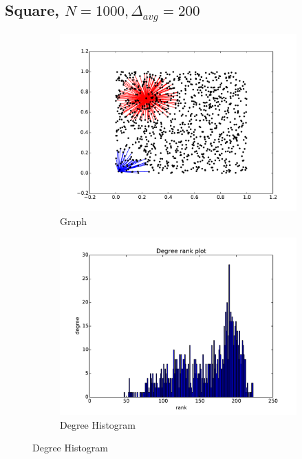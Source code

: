 \documentclass[oneside, titlepage]{scrartcl}
\begin{document}
\subsection{Square, $N=1000, \Delta_{avg}=200$}

\begin{figure}[!h]
\centering
\begin{subfigure}{0.5\textwidth}
	\centering
	\includegraphics[width=0.9\linewidth]{figures/graph50.pdf}
	\caption{Graph}
\end{subfigure}%
\begin{subfigure}{0.5\textwidth}
	\centering
	\includegraphics[width=0.9\linewidth]{figures/degrees50.pdf}
	\caption{Degree Histogram}
\end{subfigure}


\end{figure}
\end{document}
